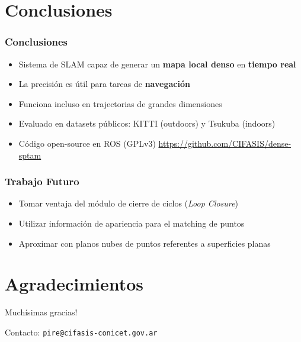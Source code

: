 \documentclass[compress]{beamer}
\begin{document}
\section{Conclusiones}

\begin{frame}
	\frametitle{Conclusiones}
	\begin{itemize}
		\item Sistema de SLAM capaz de generar un \textbf{mapa local denso} en \textbf{tiempo real}
        \item La precisión es útil para tareas de \textbf{navegación}
        \item Funciona incluso en trajectorias de grandes dimensiones
        \item Evaluado en datasets públicos: KITTI (outdoors) y Tsukuba (indoors)
	    \item Código open-source en ROS (GPLv3)
	    \url{https://github.com/CIFASIS/dense-sptam}
	\end{itemize}
\end{frame}

\begin{frame}
	\frametitle{Trabajo Futuro}
	\begin{itemize}
		\item Tomar ventaja del módulo de cierre de ciclos (\emph{Loop Closure})
		\item Utilizar información de apariencia para el matching de puntos
		\item Aproximar con planos nubes de puntos referentes a superficies planas
	\end{itemize}
\end{frame}


\section*{Agradecimientos}

\begin{frame}
	\centering
	\Large{Muchísimas gracias!}
	
	
	\vspace{2cm}
	Contacto: {\tt pire@cifasis-conicet.gov.ar}
\end{frame}
\end{document}

